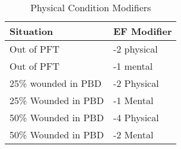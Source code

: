 \begin{table}[h]
\caption{Physical Condition Modifiers}
\centering
	\begin{tabular}{||l|l||} \hline
	Situation			& EF Modifier	\\ \hline
	Out of PFT			& -2 physical	\\
	Out of PFT			& -1 mental		\\
	25\% wounded in PBD & -2 Physical	\\
	25\% Wounded in PBD & -1 Mental		\\
	50\% Wounded in PBD & -4 Physical	\\
	50\% Wounded in PBD & -2 Mental		\\ \hline
	\end{tabular}
\end{table}
